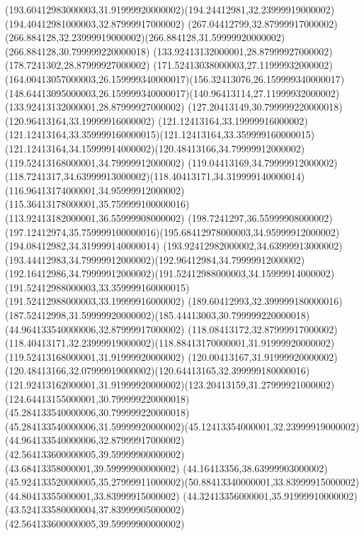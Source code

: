 {{	\curveto(193.60412983000003,31.91999920000002)(194.24412981,32.23999919000002)(194.40412981000003,32.87999917000002)
	\lineto(267.04412799,32.87999917000002)
	\curveto(266.884128,32.23999919000002)(266.884128,31.59999920000002)(266.884128,30.799999220000018)
	\closepath
	\moveto(133.92413132000001,28.87999927000002)
	\lineto(178.7241302,28.87999927000002)
	\curveto(171.52413038000003,27.11999932000002)(164.00413057000003,26.159999340000017)(156.32413076,26.159999340000017)
	\curveto(148.64413095000003,26.159999340000017)(140.96413114,27.11999932000002)(133.92413132000001,28.87999927000002)
	\closepath
	\moveto(127.20413149,30.799999220000018)
	\lineto(120.96413164,33.19999916000002)
	\curveto(121.12413164,33.19999916000002)(121.12413164,33.359999160000015)(121.12413164,33.359999160000015)
	\curveto(121.12413164,34.15999914000002)(120.48413166,34.79999912000002)(119.52413168000001,34.79999912000002)
	\curveto(119.04413169,34.79999912000002)(118.7241317,34.63999913000002)(118.40413171,34.319999140000014)
	\curveto(116.96413174000001,34.95999912000002)(115.36413178000001,35.759999100000016)(113.92413182000001,36.55999908000002)
	\lineto(198.7241297,36.55999908000002)
	\curveto(197.12412974,35.759999100000016)(195.68412978000003,34.95999912000002)(194.08412982,34.319999140000014)
	\curveto(193.92412982000002,34.63999913000002)(193.44412983,34.79999912000002)(192.96412984,34.79999912000002)
	\curveto(192.16412986,34.79999912000002)(191.52412988000003,34.15999914000002)(191.52412988000003,33.359999160000015)
	\lineto(191.52412988000003,33.19999916000002)
	\curveto(189.60412993,32.399999180000016)(187.52412998,31.59999920000002)(185.44413003,30.799999220000018)
	\closepath
	\moveto(44.964133540000006,32.87999917000002)
	\lineto(118.08413172,32.87999917000002)
	\curveto(118.40413171,32.23999919000002)(118.88413170000001,31.91999920000002)(119.52413168000001,31.91999920000002)
	\curveto(120.00413167,31.91999920000002)(120.48413166,32.07999919000002)(120.64413165,32.399999180000016)
	\curveto(121.92413162000001,31.91999920000002)(123.20413159,31.27999921000002)(124.64413155000001,30.799999220000018)
	\lineto(45.284133540000006,30.799999220000018)
	\curveto(45.284133540000006,31.59999920000002)(45.12413354000001,32.23999919000002)(44.964133540000006,32.87999917000002)
	\closepath
	\moveto(42.564133600000005,39.59999900000002)
	\lineto(43.68413358000001,39.59999900000002)
	\curveto(44.16413356,38.63999903000002)(45.924133520000005,35.27999911000002)(50.88413340000001,33.83999915000002)
	\lineto(44.80413355000001,33.83999915000002)
	\curveto(44.32413356000001,35.91999910000002)(43.524133580000004,37.83999905000002)(42.564133600000005,39.59999900000002)
	\closepath
}
}


